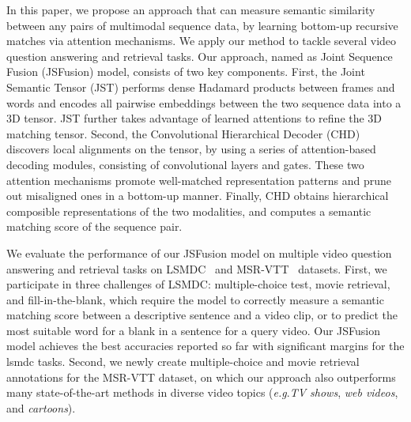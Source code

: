 \documentclass[runningheads]{llncs}
\makeatletter
\DeclareRobustCommand\onedot{\futurelet\@let@token\@onedot}
\def\onedot{.\@\xspace}
\def\eg{\textit{e.g}\onedot} \def\Eg{\textit{E.g}\onedot}
\makeatother
\begin{document}
In this paper, we propose an approach that can measure semantic similarity between any pairs of multimodal sequence data, by learning bottom-up recursive matches via attention mechanisms.
We apply our method to tackle several video question answering and retrieval tasks. Our approach, named as Joint Sequence Fusion (JSFusion) model, consists of two key components. First, the Joint Semantic Tensor (JST) performs dense Hadamard products between frames and words and encodes all pairwise embeddings between the two sequence data into a 3D tensor. 
JST further takes advantage of learned attentions to  refine the 3D matching tensor. 
Second, the Convolutional Hierarchical Decoder (CHD) discovers local alignments on the tensor, by using a series of attention-based decoding modules, consisting of convolutional layers and gates. 
These two attention mechanisms promote well-matched representation patterns and prune out misaligned ones in a bottom-up manner.
Finally, CHD obtains hierarchical composible representations of the two modalities, and computes a semantic matching score of the sequence pair. 





We evaluate the performance of our JSFusion model on multiple video question answering and retrieval tasks on LSMDC~\cite{rohrbach-arxiv-2016} and MSR-VTT~\cite{xu-CVPR-2016} datasets.  
First, we participate in three challenges of LSMDC: multiple-choice test, movie retrieval, and fill-in-the-blank,  
which require the model to correctly measure a semantic matching score between a descriptive sentence and a video clip,  
or to predict the most suitable word for a blank in a sentence for a query video.  
Our JSFusion model achieves the best accuracies reported so far with significant margins for the lsmdc tasks.  
Second, we newly create multiple-choice and movie retrieval annotations for the MSR-VTT dataset,  
on which our approach also outperforms many state-of-the-art methods in diverse video topics (\eg \textit{TV shows}, \textit{web videos}, and \textit{cartoons}).  

\begin{comment}
The LSMDC (\textit{Large Scale Movie Description Challenge}) has been one of the most active and successful challenge series to boost up the progress of video and language research.
The challenge defines four interesting tasks on the LSMDC dataset that combines two previous datasets: MPII Movie description dataset (MPII-MD)~\cite{rohrbach-cvpr-2015} and Montreal Video Annotation Dataset (M-VAD)~\cite{torabi-mvad-2015}.
We design a different base model for each of LSMDC tasks, based on JSFusion module Figure~\ref{fig:keyidea} given video and natural language sequence pair.

(i) \textit{multiple-choice test}: given a video query and five descriptive sentences, choosing the most correct one out of them,
(ii) \textit{Movie retrieval}: ranking 1,000 movie clips for a given natural language query,
and (iii) \textit{Fill-in-the-blank}: given a video and a sentence with a single blank, filling in the blank by finding a suitable word from the whole vocabulary set.
Pair of video and natural language sequence are given to solve each task. 
\end{comment}
\end{document}
